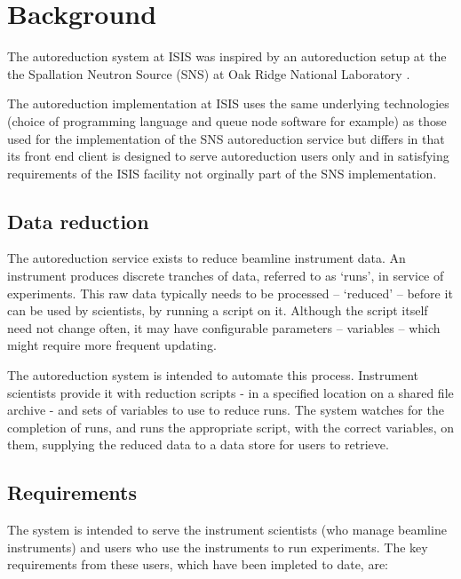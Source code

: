 \documentclass[twocolumn]{article}
\begin{document}
\section{Background}\label{background}

The autoreduction system at ISIS was inspired by an autoreduction setup at the
the Spallation Neutron Source (SNS) at Oak Ridge National Laboratory \cite{autoreductionSNS}. 

The autoreduction implementation at ISIS uses the same underlying 
technologies (choice of programming language and queue node software
for example) as those used for the implementation of the SNS autoreduction
service but differs in that its front end client is designed to serve
autoreduction users only and in satisfying requirements of the ISIS 
facility not orginally part of the SNS implementation.

\subsection{Data reduction}\label{data-reduction}

The autoreduction service exists to reduce beamline instrument data. An
instrument produces discrete tranches of data, referred to as `runs', in
service of experiments. This raw data typically needs to be processed --
`reduced' -- before it can be used by scientists, by running a script on
it. Although the script itself need not change often, it may have
configurable parameters -- variables -- which might require more frequent
updating.

The autoreduction system is intended to automate this process.
Instrument scientists provide it with reduction scripts - in a specified
location on a shared file archive - and sets of variables to use to
reduce runs. The system watches for the completion of runs, and runs the
appropriate script, with the correct variables, on them, supplying the
reduced data to a data store for users to retrieve.

\subsection{Requirements}\label{requirements}

The system is intended to serve the instrument scientists (who manage beamline instruments) 
and users who use the instruments to run experiments. 
The key requirements from these users, which have been impleted to date, are:
\end{document}
